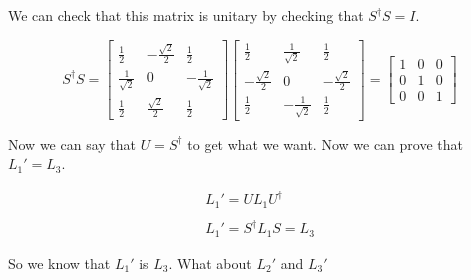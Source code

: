 We can check that this matrix is unitary by checking that $S^{\dagger}S = I$.

\begin{equation}
  S^{\dagger} S = \left[\begin{matrix}
    \frac{1}{2} & -\frac{\sqrt{2}}{2} & \frac{1}{2}\\
    \frac{1}{\sqrt{2}} & 0 & -\frac{1}{\sqrt{2}}\\
    \frac{1}{2} & \frac{\sqrt{2}}{2} & \frac{1}{2}
  \end{matrix}\right] \left[\begin{matrix}
    \frac{1}{2} & \frac{1}{\sqrt{2}} & \frac{1}{2}\\
    -\frac{\sqrt{2}}{2} & 0 & -\frac{\sqrt{2}}{2}\\
    \frac{1}{2} & -\frac{1}{\sqrt{2}} & \frac{1}{2}
  \end{matrix}\right] =
  \left[
    \begin{matrix}
      1 & 0 & 0\\
      0 & 1 & 0\\
      0 & 0 & 1
    \end{matrix}
  \right]
\end{equation}

Now we can say that $U = S^{\dagger}$ to get what we want. Now we can prove that $L_1' = L_3$.

\begin{equation}
  \begin{array}{c}
    L_1' = U L_1 U^{\dagger}
    \\

    \\
    L_1' = S^{\dagger} L_1 S = L_3
  \end{array}
\end{equation}

So we know that $L_1'$ is $L_3$. What about $L_2'$ and $L_3'$

